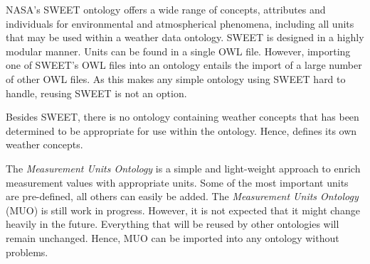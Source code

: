 NASA's SWEET ontology offers a wide range of concepts, attributes and individuals for environmental and atmospherical phenomena, including all units that may be used within a weather data ontology. SWEET is designed in a highly modular manner. Units can be found in a single OWL file. However, importing one of SWEET's OWL files into an ontology entails the import of a large number of other OWL files. As this makes any simple ontology using SWEET hard to handle, reusing SWEET is not an option.

Besides SWEET, there is no ontology containing weather concepts that has been determined to be appropriate for use within the \thinkhomeweather ontology. Hence, \thinkhomeweather defines its own weather concepts.

The \emph{Measurement Units Ontology} is a simple and light-weight approach to enrich measurement values with appropriate units. Some of the most important units are pre-defined, all others can easily be added. The \emph{Measurement Units Ontology} (MUO) is still work in progress. However, it is not expected that it might change heavily in the future. Everything that will be reused by other ontologies will remain unchanged. Hence, MUO can be imported into any ontology without problems.

